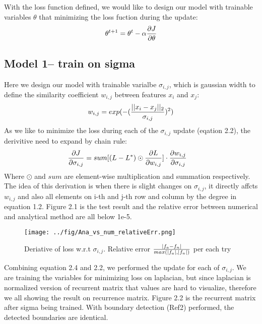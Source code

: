 \documentclass[final]{siamltexmm}
\begin{document}
With the loss function defined, we would like to design our model with trainable variables $\theta$ that minimizing the loss fuction during the update:
\begin{equation}
\theta^{t+1} = \theta^{t} - \alpha {\partial J \over \partial \theta}
\end{equation}

\subsection{Model 1-- train on sigma}
Here we design our model with trainable varialbe $\sigma_{i,j}$, which is gaussian width to define the similarity coefficient $w_{i,j}$ between features $x_i$ and $x_j$:
\begin{equation}
w_{i,j} = exp(- ({|| x_i - x_j ||_2 \over \sigma_{i,j} })^2)
\end{equation}
As we like to minimize the loss during each of the $\sigma_{i,j}$ update (eqation 2.2), the derivitive need to expand by chain rule:
\begin{equation}
\begin{aligned}
{\partial J \over \partial \sigma_{i,j}} &= sum[(L - L^{\ast}) \odot {\partial L \over \partial w_{i,j}}] \cdot {\partial w_{i,j} \over \partial \sigma_{i,j}}
\end{aligned}
\end{equation}
Where $\odot$ and $sum$ are element-wise multiplication and summation respectively. The idea of this derivation is when there is slight changes on $\sigma_{i,j}$, it directly affcts $w_{i,j}$ and also all elements on i-th and j-th row and column by the degree in equation 1.2. Figure 2.1 is the test result and the relative error between numerical and analytical method are all below 1e-5.

\begin{figure}[H]
  \centering
    \texttt{[image: ../fig/Ana\_vs\_num\_relativeErr.png]}
  \caption{Deriative of loss w.r.t $\sigma_{i,j}$. Relative error $|f_a - f_n| \over max(|f_a|, |f_n|)$ per each try}
\end{figure}

Combining equation 2.4 and 2.2, we performed the update for each of $\sigma_{i,j}$. We are training the variables for minimizing loss on laplacian, but since laplacian is normalized version of recurrent matrix that values are hard to visualize, therefore we all showing the result on recurrence matrix. Figure 2.2 is the recurrent matrix after sigma being trained. With boundary detection (Ref2) performed, the detected boundaries are identical.
\end{document}
